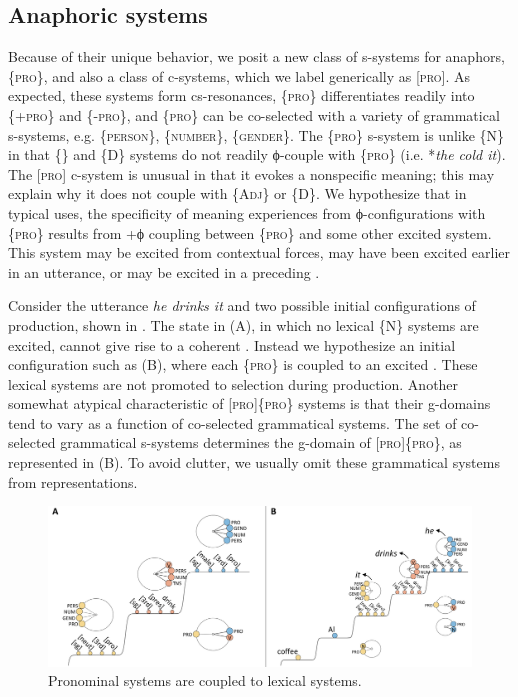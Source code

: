 \subsection{Anaphoric systems}

Because of their unique behavior, we posit a new class of s-systems for anaphors, \{\textsc{pro}\}, and also a class of  c-systems, which we label generically as [\textsc{pro}]. As expected, these systems form cs-resonances,  \{\textsc{pro}\} differentiates readily into \{+\textsc{pro}\} and \{-\textsc{pro}\}, and \{\textsc{pro}\} can be co-selected with a variety of grammatical s-systems, e.g. \{\textsc{person}\}, \{\textsc{number}\}, \{\textsc{gender}\}. The \{\textsc{pro}\} s-system is unlike \{N\} in that \{\} and \{D\} systems do not readily ϕ-couple with \{\textsc{pro}\} (i.e. *\textit{the cold it}). The [\textsc{pro}] c-system is unusual in that it evokes a nonspecific meaning; this may explain why it does not couple with \{A\textsc{dj}\} or \{D\}. We hypothesize that in typical uses, the specificity of meaning experiences from ϕ-con\-fig\-u\-ra\-tions with \{\textsc{pro}\} results from +ϕ coupling between \{\textsc{pro}\} and some other excited system. This system may be excited from contextual forces, may have been excited earlier in an utterance, or may be excited in a  preceding . 

   Consider the utterance \textit{he drinks it} and two possible initial configurations of production, shown in {}. The state in (A), in which no lexical \{N\} systems are excited, cannot give rise to a coherent . Instead we hypothesize an initial configuration such as (B), where each \{\textsc{pro}\} is coupled to an excited . These lexical systems are not promoted to selection during production. Another somewhat atypical characteristic of [\textsc{pro}]\{\textsc{pro}\} systems is that their g-domains tend to vary as a function of co-selected grammatical systems. The set of co-selected grammatical s-systems determines the g-domain of [\textsc{pro}]\{\textsc{pro}\}, as represented in (B). To avoid clutter, we usually omit these grammatical systems from representations.   

  
\begin{figure}
\includegraphics[width=\textwidth]{figures/Tilsen-img152.png}
\caption{Pronominal systems are coupled to lexical systems.}
\label{fig:7:8}
\end{figure}
 

